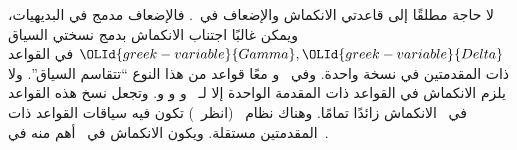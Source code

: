 \documentclass[../../../include/open-logic-section]{subfiles}
\begin{document}
لا حاجة مطلقًا إلى قاعدتي الانكماش والإضعاف في~. فالإضعاف مدمج
في البديهيات، ويمكن غالبًا اجتناب الانكماش بدمج نسختي السياق
$\OLId{greek-variable}{Gamma},\OLId{greek-variable}{Delta}$ في القواعد ذات المقدمتين في نسخة واحدة. وفي~
و معًا قواعد من هذا النوع ``تتقاسم السياق''. ولا يلزم الانكماش في
القواعد ذات المقدمة الواحدة إلا لـ~\RightR{\lor} و\LeftR{\land} و
\RightR{\lexists} و\LeftR{\lforall}. وتجعل نسخ هذه القواعد في~
الانكماش زائدًا تمامًا. وهناك نظام~ (انظر~) تكون
فيه سياقات القواعد ذات المقدمتين مستقلة. ويكون الانكماش في~ أهم
منه في~.


\end{document}
